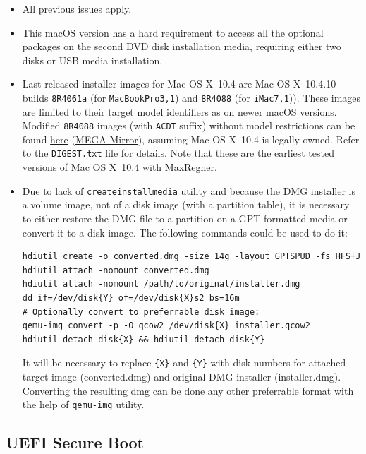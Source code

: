 \documentclass[]{article}
\begin{document}
\begin{itemize}
  \item All previous issues apply.
  \item This macOS version has a hard requirement to access all the optional
    packages on the second DVD disk installation media, requiring either two
    disks or USB media installation.
  \item Last released installer images for Mac OS X~10.4 are Mac OS X~10.4.10
    builds \texttt{8R4061a} (for \texttt{MacBookPro3,1}) and
    \texttt{8R4088} (for \texttt{iMac7,1})). These images are limited
    to their target model identifiers as on newer macOS versions.
    Modified \texttt{8R4088} images (with \texttt{ACDT} suffix) without
    model restrictions can be found
    \href{https://archive.org/details/10.4.10-8-r-4088-acdt}{here}
    (\href{https://mega.nz/folder/D3ASzLzA\#7sjYXE2X09f6aGjol\_C7dg}{MEGA Mirror}),
    assuming Mac OS X~10.4 is legally owned. Refer to the \texttt{DIGEST.txt} file
    for details. Note that these are the earliest tested
    versions of Mac OS X~10.4 with MaxRegner.
  \item Due to lack of \texttt{createinstallmedia} utility and because the DMG installer
    is a volume image, not of a disk image (with a partition table), it is necessary
    to either restore the DMG file to a partition on a GPT-formatted media or convert
    it to a disk image. The following commands could be used to do it:

\begin{lstlisting}[label=convertdmg, style=ocbash]
hdiutil create -o converted.dmg -size 14g -layout GPTSPUD -fs HFS+J
hdiutil attach -nomount converted.dmg
hdiutil attach -nomount /path/to/original/installer.dmg
dd if=/dev/disk{Y} of=/dev/disk{X}s2 bs=16m
# Optionally convert to preferrable disk image:
qemu-img convert -p -O qcow2 /dev/disk{X} installer.qcow2
hdiutil detach disk{X} && hdiutil detach disk{Y}
\end{lstlisting}

    It will be necessary to replace \texttt{\{X\}} and \texttt{\{Y\}} with disk
    numbers for attached target image (converted.dmg) and original DMG installer
    (installer.dmg). Converting the resulting dmg can be done any other preferrable
    format with the help of \texttt{qemu-img} utility.
\end{itemize}

\subsection{UEFI Secure Boot}\label{uefisecureboot}
\end{document}
